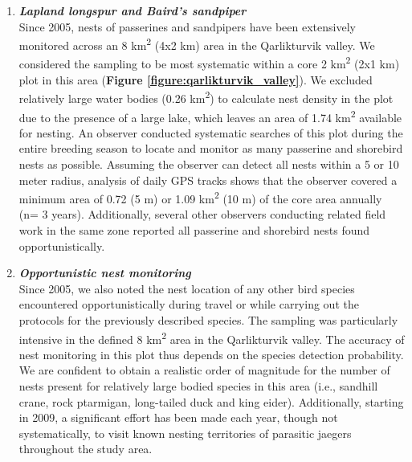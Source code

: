 \documentclass[a4paper,twoside,12pt]{article}
\begin{document}
\begin{enumerate}[label=\roman*]
        \item[] \textit{\textbf{Lapland longspur and Baird's sandpiper}}\\
        Since 2005, nests of passerines and sandpipers have been extensively monitored across an 8 km\textsuperscript{2} (4x2 km) area in the Qarlikturvik valley. We considered the sampling to be most systematic within a core 2 km\textsuperscript{2} (2x1 km) plot in this area (\textbf{Figure \ref{figure:qarlikturvik_valley}}). We excluded relatively large water bodies (0.26 km\textsuperscript{2}) to calculate nest density in the plot due to the presence of a large lake, which leaves an area of 1.74 km\textsuperscript{2} available for nesting. An observer conducted systematic searches of this plot during the entire breeding season to locate and monitor as many passerine and shorebird nests as possible. Assuming the observer can detect all nests within a 5 or 10 meter radius, analysis of daily GPS tracks shows that the observer covered a minimum area of 0.72  (5 m) or 1.09  km\textsuperscript{2} (10 m) of the core area annually (n= 3 years). Additionally, several other observers conducting related field work in the same zone reported all passerine and shorebird nests found opportunistically.
        
        \item[] \textit{\textbf{Opportunistic nest monitoring}}\\
        Since 2005, we also noted the nest location of any other bird species encountered opportunistically during travel or while carrying out the protocols for the previously described species. The sampling was particularly intensive in the defined 8 km\textsuperscript{2} area in the Qarlikturvik valley. The accuracy of nest monitoring in this plot thus depends on the species detection probability. We are confident to obtain a realistic order of magnitude for the number of nests present for relatively large bodied species in this area (i.e., sandhill crane, rock ptarmigan, long-tailed duck and king eider). Additionally, starting in 2009, a significant effort has been made each year, though not systematically, to visit known nesting territories of parasitic jaegers throughout the study area.
        \end{enumerate}


\newpage
\end{document}
